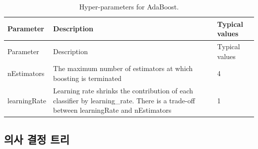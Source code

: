 \documentclass[11pt]{book}
\theoremstyle{definition}
\theoremstyle{definition}
\theoremstyle{definition}
\theoremstyle{remark}
\begin{document}
\begin{longtable}[]{@{}lll@{}}
\caption{\label{tab:adaBoostParameters} Hyper-parameters for
AdaBoost.}\tabularnewline
\toprule
\begin{minipage}[b]{0.13\columnwidth}\raggedright\strut
Parameter\strut
\end{minipage} & \begin{minipage}[b]{0.16\columnwidth}\raggedright\strut
Description\strut
\end{minipage} & \begin{minipage}[b]{0.20\columnwidth}\raggedright\strut
Typical values\strut
\end{minipage}\tabularnewline
\midrule
\endfirsthead
\toprule
\begin{minipage}[b]{0.13\columnwidth}\raggedright\strut
Parameter\strut
\end{minipage} & \begin{minipage}[b]{0.16\columnwidth}\raggedright\strut
Description\strut
\end{minipage} & \begin{minipage}[b]{0.20\columnwidth}\raggedright\strut
Typical values\strut
\end{minipage}\tabularnewline
\midrule
\endhead
\begin{minipage}[t]{0.13\columnwidth}\raggedright\strut
nEstimators\strut
\end{minipage} & \begin{minipage}[t]{0.16\columnwidth}\raggedright\strut
The maximum number of estimators at which boosting is terminated\strut
\end{minipage} & \begin{minipage}[t]{0.20\columnwidth}\raggedright\strut
4\strut
\end{minipage}\tabularnewline
\begin{minipage}[t]{0.13\columnwidth}\raggedright\strut
learningRate\strut
\end{minipage} & \begin{minipage}[t]{0.16\columnwidth}\raggedright\strut
Learning rate shrinks the contribution of each classifier by
learning\_rate. There is a trade-off between learningRate and
nEstimators\strut
\end{minipage} & \begin{minipage}[t]{0.20\columnwidth}\raggedright\strut
1\strut
\end{minipage}\tabularnewline
\bottomrule
\end{longtable}

\subsection{의사 결정 트리}\label{--}
\end{document}
